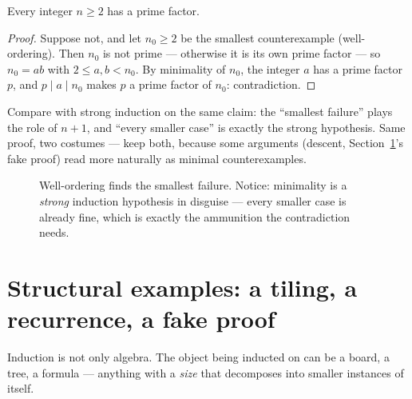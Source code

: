 \begin{theorem}\label{thm:primefactor}
Every integer $n \ge 2$ has a prime factor.
\end{theorem}

\begin{proof}
Suppose not, and let $n_0 \ge 2$ be the smallest counterexample (well-ordering).
Then $n_0$ is not prime --- otherwise it is its own prime factor --- so
$n_0 = ab$ with $2 \le a, b < n_0$. By minimality of $n_0$, the integer $a$ has
a prime factor $p$, and $p \mid a \mid n_0$ makes $p$ a prime factor of $n_0$:
contradiction.
\end{proof}

Compare with strong induction on the same claim: the ``smallest failure''
plays the role of $n+1$, and ``every smaller case'' is exactly the strong
hypothesis. Same proof, two costumes --- keep both, because some arguments
(descent, Section~\ref{sec:structure}'s fake proof) read more naturally as
minimal counterexamples.

\begin{figure}[ht]\centering

\caption{Well-ordering finds the smallest failure. Notice: minimality is a
\emph{strong} induction hypothesis in disguise --- every smaller case is
already fine, which is exactly the ammunition the contradiction needs.}
\label{fig:wop}
\end{figure}

\section{Structural examples: a tiling, a recurrence, a fake proof}
\label{sec:structure}

Induction is not only algebra. The object being inducted on can be a board, a
tree, a formula --- anything with a \emph{size} that decomposes into smaller
instances of itself.

